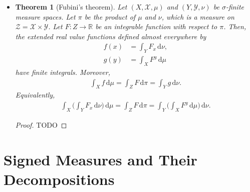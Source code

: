 \documentclass[10pt]{article}
\newtheorem{theorem}[lemma]{Theorem}
\newcommand{\dee}{\mathrm{d}}
\newcommand{\mcal}[1]{\mathcal{#1}}
\newcommand{\Real}{\mathbb{R}}
\begin{document}
\begin{itemize}
  \begin{proof}
    TODO. This requires the monotone class theorem (Theorem~\ref{theorem:monotone-class}).
  \end{proof} 

  \item \begin{theorem}[Fubini's theorem]
    Let $(X,\mcal{X},\mu)$ and $(Y, \mcal{Y}, \nu)$ be $\sigma$-finite measure spaces. Let $\pi$ be the product of $\mu$ and $\nu$, which is a measure on $\mcal{Z} = \mcal{X} \times \mcal{Y}$. Let $F: Z \rightarrow \Real$ be an integrable function with respect to $\pi$. Then, the extended real value functions defined almost everywhere by
    \begin{align*}
      f(x) &= \int_Y F_x\, \dee\nu, \\
      g(y) &= \int_X F^y\, \dee\mu
    \end{align*}
    have finite integrals. Moreover,
    \begin{align*}
      \int_X f\, \dee\mu = \int_Z F\, \dee\pi = \int_Y g\,\dee\nu.
    \end{align*}
    Equivalently,
    \begin{align*}
      \int_X \bigg( \int_Y F_x\, \dee\nu \bigg)\, \dee\mu = \int_Z F\, \dee\pi = \int_Y \bigg( \int_X F^y\, \dee\mu \bigg)\,\dee\nu.
    \end{align*}
  \end{theorem}

  \begin{proof}
    TODO
  \end{proof}
\end{itemize}

\section{Signed Measures and Their Decompositions}
\end{document}
